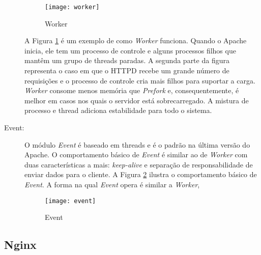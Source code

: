 \begin{description}
\begin{figure}[!h]
  \centering
  \texttt{[image: worker]} 
  \caption{Worker}
  \label{fig:worker} 
\end{figure}

A Figura \ref{fig:worker} é um exemplo de como \textit{Worker} funciona.
Quando o Apache inicia, ele tem um processo de controle e alguns processos
filhos que mantêm um grupo de threads paradas. A segunda parte da figura
representa o caso em que o HTTPD recebe um grande número de requisições e o
processo de controle cria mais filhos para suportar a carga. \textit{Worker}
consome menos memória que \textit{Prefork} e, consequentemente, é melhor em
casos nos quais o servidor está sobrecarregado.  A mistura de processo e thread
adiciona estabilidade para todo o sistema.

	\item [Event:] O módulo \textit{Event} é baseado em threads e é o padrão na
última versão do Apache. O comportamento básico de \textit{Event} é similar ao
de \textit{Worker} com duas características a mais: \textit{keep-alive} e
separação de responsabilidade de enviar dados para o cliente. A Figura
\ref{fig:event} ilustra o comportamento básico de \textit{Event}. A forma na
qual \textit{Event} opera é similar a \textit{Worker}, 

\begin{figure}[!h]
  \centering
  \texttt{[image: event]} 
  \caption{Event}
  \label{fig:event} 
\end{figure}

\end{description}

\subsection{Nginx}

